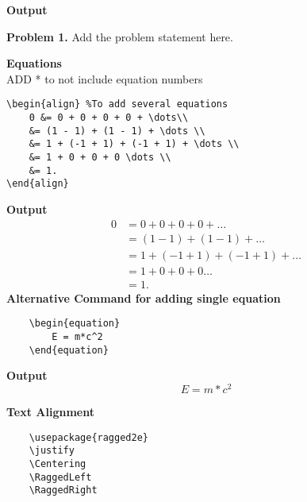 \documentclass[12pt]{amsart}
\newenvironment{statement}[1]{\smallskip\noindent\color[rgb]{1.00,0.00,0.50} {\bf #1.}}{}
\theoremstyle{definition}
\theoremstyle{remark}
\begin{document}
\textbf{Output}
\begin{framed}
    \begin{statement}{Problem 1}
        Add the problem statement here.
    \end{statement}
\end{framed}

\textbf{Equations}
\\
ADD * to not include equation numbers
\begin{verbatim}
\begin{align} %To add several equations
    0 &= 0 + 0 + 0 + 0 + \dots\\
    &= (1 - 1) + (1 - 1) + \dots \\
    &= 1 + (-1 + 1) + (-1 + 1) + \dots \\
    &= 1 + 0 + 0 + 0 \dots \\
    &= 1.
\end{align}
\end{verbatim}
\textbf{Output}
\begin{align} %
    0 &= 0 + 0 + 0 + 0 + \dots\\
    &= (1 - 1) + (1 - 1) + \dots \\
    &= 1 + (-1 + 1) + (-1 + 1) + \dots \\
    &= 1 + 0 + 0 + 0 \dots \\
    &= 1.
\end{align}
\textbf{Alternative Command for adding single equation}
\begin{verbatim}
    \begin{equation}
        E = m*c^2
    \end{equation}
\end{verbatim}
\textbf{Output}
\begin{equation}
    E = m*c^2
\end{equation}

\textbf{Text Alignment}
\begin{verbatim}
    \usepackage{ragged2e}
    \justify
    \Centering
    \RaggedLeft
    \RaggedRight
\end{verbatim}
\end{document}
